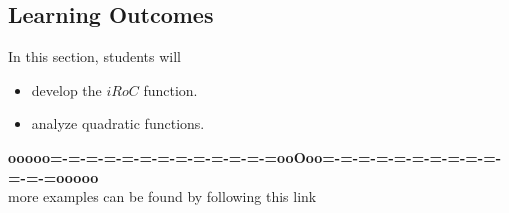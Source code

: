 \documentclass{ximera}
\begin{document}
\subsection{Learning Outcomes}

\begin{sectionOutcomes}
In this section, students will 

\begin{itemize}
\item develop the $iRoC$ function.
\item analyze quadratic functions.
\end{itemize}
\end{sectionOutcomes}















\begin{center}
\textbf{\textcolor{green!50!black}{ooooo=-=-=-=-=-=-=-=-=-=-=-=-=ooOoo=-=-=-=-=-=-=-=-=-=-=-=-=ooooo}} \\

more examples can be found by following this link\\ 

\end{center}
\end{document}
